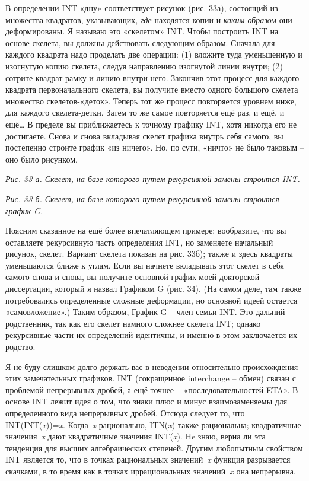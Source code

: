 \documentclass[../main.tex]{subfiles}
\begin{document}
В определении INT «дну» соответствует рисунок (рис. 33а), состоящий из множества квадратов, указывающих, \emph{где} находятся копии и \emph{каким образом} они деформированы. Я называю это «скелетом» INT. Чтобы построить INT на основе скелета, вы должны действовать следующим образом. Сначала для каждого квадрата надо проделать две операции: (1) вложите туда уменьшенную и изогнутую копию скелета, следуя направлению изогнутой линии внутри; (2) сотрите квадрат-рамку и линию внутри него. Закончив этот процесс для каждого квадрата первоначального скелета, вы получите вместо одного большого скелета множество скелетов-«деток». Теперь тот же процесс повторяется уровнем ниже, для каждого скелета-детки. Затем то же самое повторяется ещё раз, и ещё, и ещё\ldots{} В пределе вы приближаетесь к точному графику INT, хотя никогда его не достигаете. Снова и снова вкладывая скелет графика внутрь себя самого, вы постепенно строите график «из ничего». Но, по сути, «ничто» не было таковым \--- оно было рисунком.

\emph{Рис. 33 а. Скелет, на базе которого путем рекурсивной замены строится INT.}

\emph{Рис. 33 б. Скелет, на базе которого путем рекурсивной замены строится график G.}

Поясним сказанное на ещё более впечатляющем примере: вообразите, что вы оставляете рекурсивную часть определения INT, но заменяете начальный рисунок, скелет. Вариант скелета показан на рис. 33б); также и здесь квадраты уменьшаются ближе к углам. Если вы начнете вкладывать этот скелет в себя самого снова и снова, вы получите основной график моей докторской диссертации, который я назвал Графиком G (рис. 34). (На самом деле, там также потребовались определенные сложные деформации, но основной идеей остается «самовложение».) Таким образом, График G \--- член семьи INT. Это дальний родственник, так как его скелет намного сложнее скелета INT; однако рекурсивные части их определений идентичны, и именно в этом заключается их родство.

Я не буду слишком долго держать вас в неведении относительно происхождения этих замечательных графиков. INT (сокращенное interchange \--- обмен) связан с проблемой непрерывных дробей, а ещё точнее \--- «последовательностей ETA». В основе INT лежит идея о том, что знаки плюс и минус взаимозаменяемы для определенного вида непрерывных дробей. Отсюда следует то, что INT(INT(\emph{x}))=\emph{x}. Когда~\emph{x} рационально, ITN(\emph{x}) также рациональна; квадратичные значения~\emph{x} дают квадратичные значения INT(\emph{x}). He знаю, верна ли эта тенденция для высших алгебраических степеней. Другим любопытным свойством INT является то, что в точках рациональных значений~\emph{x} функция разрывается скачками, в то время как в точках иррациональных значений~\emph{x} она непрерывна.
\end{document}
